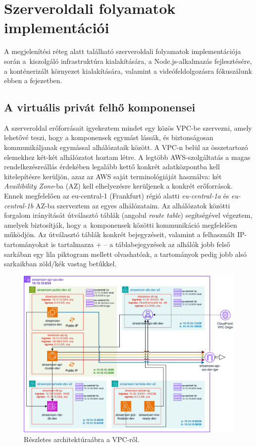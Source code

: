 \chapter{Szerveroldali folyamatok implementációi}

A megjelenítési réteg alatt található szerveroldali folyamatok implementációja során a~kiszolgáló infrastruktúra kialakítására, a Node.js-alkalmazás fejlesztésére, a konténerizált környezet kialakítására, valamint a videófeldolgozásra fókuszálunk ebben a fejezetben.

\section{A virtuális privát felhő komponensei}\label{sec:vpc}

A szerveroldal erőforrásait igyekeztem mindet egy közös VPC-be szervezni, amely lehetővé teszi, hogy a komponensek egymást lássák, és biztonságosan kommunikáljanak egymással alhálózataik között. A VPC-n belül az összetartozó elemekhez két-két alhálózatot hoztam létre. A legtöbb AWS-szolgáltatás a magas rendelkezésreállás érdekében legalább kettő konkrét adatközpontba kell kitelepítésre kerüljön, azaz az AWS saját terminológiáját használva: két \emph{Availibility Zone}-ba (AZ) kell elhelyezésre kerüljenek a konkrét erőforrások. Ennek megfelelően az eu-central-1 (Frankfurt) régió alatti \emph{eu-central-1a} és \emph{eu-central-1b} AZ-ba szerveztem az egyes alhálózataim. Az alhálózatok közötti forgalom irányítását útválasztó táblák (angolul \emph{route table}) segítségével végeztem, amelyek biztosítják, hogy a~komponensek közötti kommunikáció megfelelően működjön. Az útválasztó táblák konkrét bejegyzéseit, valamint a felhasznált IP-tartományokat is tartalmazza \az+ -- a táblabejegyzések az alhálók jobb felső sarkában egy lila piktogram mellett olvashatóak, a tartományok pedig jobb alsó sarkaikban zöld/kék vastag betűkkel.

\begin{figure}
  \centering
  \includegraphics[width=150mm, keepaspectratio]{figures/dipterv_vpc.png}
  \caption{Részletes architektúraábra a VPC-ről.}
  \label{fig:vpc}
\end{figure}


